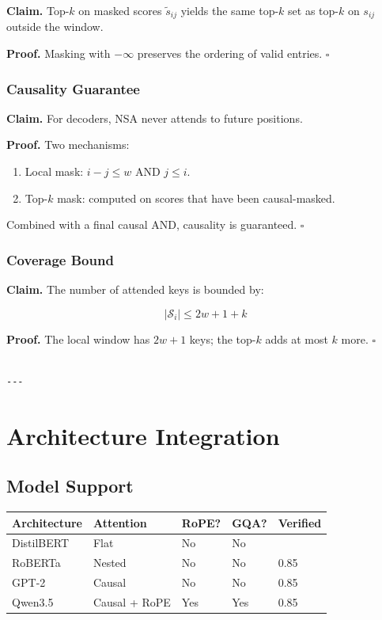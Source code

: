 \textbf{Claim.} Top-$k$ on masked scores $\tilde{s}_{ij}$ yields the same top-$k$ 
set as top-$k$ on $s_{ij}$ outside the window.

\textbf{Proof.} Masking with $-\infty$ preserves the ordering of valid entries. 
$\square$

\subsubsection{Causality Guarantee}

\textbf{Claim.} For decoders, NSA never attends to future positions.

\textbf{Proof.} Two mechanisms:
\begin{enumerate}
\item Local mask: $i - j \leq w$ AND $j \leq i$.
\item Top-$k$ mask: computed on scores that have been causal-masked.

\end{enumerate}
Combined with a final causal AND, causality is guaranteed. $\square$

\subsubsection{Coverage Bound}

\textbf{Claim.} The number of attended keys is bounded by:

\[
|\mathcal{S}_i| \leq 2w + 1 + k
\tag{4.11}
\]

\textbf{Proof.} The local window has $2w + 1$ keys; the top-$k$ adds at most $k$ 
more. $\square$
\begin{lstlisting}

---
\end{lstlisting}


\section{Architecture Integration}

\subsection{Model Support}

\begin{table}[H]
\centering
\small
\begin{tabular}{lllll}
\toprule
\textbf{Architecture} & \textbf{Attention} & \textbf{RoPE?} & \textbf{GQA?} & \textbf{Verified} \\
\midrule
DistilBERT & Flat & No & No &  \\
RoBERTa & Nested & No & No & 0.85 \\
GPT-2 & Causal & No & No & 0.85 \\
Qwen3.5 & Causal + RoPE & Yes & Yes & 0.85 \\
\bottomrule
\end{tabular}
\end{table}

